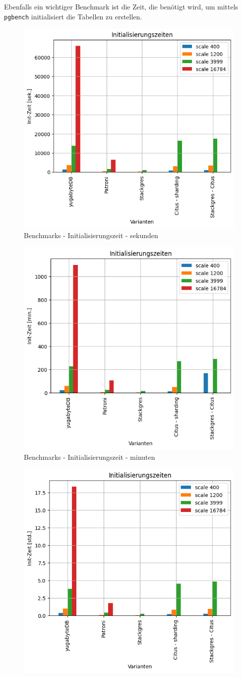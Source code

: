 \begin{flushleft}
    Ebenfalls ein wichtiger Benchmark ist die Zeit, die benötigt wird, um mittels \texttt{pgbench} initialisiert die Tabellen zu erstellen.
    \begin{figure}[H]
        \centering
        \includegraphics[width=0.5\linewidth]{source/pandas_data_chart_plotter/initializing_time_sec}
        \caption{Benchmarks - Initialisierungszeit - sekunden}
        \label{fig:initializing_time_sec}
    \end{figure}
    \begin{figure}[H]
        \centering
        \includegraphics[width=0.5\linewidth]{source/pandas_data_chart_plotter/initializing_time_min}
        \caption{Benchmarks - Initialisierungszeit - minuten}
        \label{fig:initializing_time_min}
    \end{figure}
    \begin{figure}[H]
        \centering
        \includegraphics[width=0.5\linewidth]{source/pandas_data_chart_plotter/initializing_time_hour}

\end{figure}
\end{flushleft}
